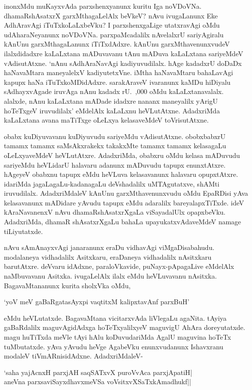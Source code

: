 inonxMdu muKayxvAda parxshenxyanunx kuritu Iga noVDoVNa. dhamaRshAsatxrX garxMthagaLelAlx beVkeV? nAvu ivugaLanunx Eke AdhAravAgi iTuTxkoLaLxbeVku? I parxshenxgaLige utatxravAgi oMdu udAharaNeyanunx noVDoVNa. parxpaMcadalilx nAvelalxrU sariyAgiralu kAnUnu garxMthagaLanunx iTiTxdAdxre. kAnUnu garxMthavenunxvudeV ilalxdidadxre kaLaLxtana mADuvavanu tAnu mADuva kaLaLxtana sariyeMdeV vAdisutAtxne. `nAnu sAdhAraNavAgi kadiyuvudilalx. hAge kadadxrU doDaDx haNavaMtara maneyalelxV kadiyutetxVne. iMtha haNavaMtaru bahaLavAgi kapupx haNa iTuTxkoMDidAdxre. sarakAraveV ivaranunx kaMDu hiDiyalu sAdhayxvAgade iruvAga nAnu kadadx rU.\ {,000} oMdu kaLaLxtanavalalx. alalxde, nAnu kaLaLxtana mADade idadxre nananx maneyalilx yArigU hoTeTxgeV iruvudilalx' eMdelAlx kaLaLxnu heVLutAtxne. AdadxriMda kaLaLxtana avana maTiTxge oLeLxya kelasaveMdeV toVrisutAtxne.

obabx kuDiyuvavanu kuDiyuvudu sariyeMdu vAdisutAtxne. obobxbabxrU tamamx tamamx saMsAkxrakekx takakxMte tamamx tamamx kelasagaLu oLeLxyaveMdeV heVLutAtxre. AdadxriMda, obabxru oMdu kelasa mADuvudu sariyeMdu heVLidarU halavaru adanunx mADuvudu tapupx enunxtAtxre. hAgeyeV obabxnu tapupx eMdu heVLuva kelasavanunx halavaru opupxtAtxre. idariMda jagaLagaLu-kadanagaLu deVshadalilx uMTAgutatxve, shAMti iruvudilalx. AdadxriMdaleV kAnUnu garxMthavenunxvudu oMdu EpaRDisi yAva kelasavanunx mADidare yAvudu tapupx eMdu adaralilx bareyalapxTiTxde. ideV kAraNavanenxV nAvu dhamaRshAsatxrXgaLa viSayadalUlx opapxbeVku. AdadxriMda, dhamaR shAsatxrXgaLu bahaLa upayukatxvAdaveMdeV namage tiLiyutatxde.

nAvu sAmAnayxvAgi janaranunx eraDu vidhavAgi viMgaDisabahudu. modalaneya vidhadalilx Asitxkaru, eraDaneya vidhadalilx nAsitxkaru barutAtxre. deVvaru idAdxne, paraloVkavide, puNayx-pApagaLive eMdelAlx naMbuvavanu Asitxka. ivugaLelAlx ilalx eMdu heVLuvavanu nAsitxka. BagavaMtananunx kurita sholxVka oMdu, 

\begin{shloka}
`yoV meV gaBaRgatasAyxpi vaqtitxM kalipxtavAnf parxBuH'
\end{shloka}

\noindent eMdu heVLutatxde. BagavaMtana vicitarxvAda liVlegaLu agaNita. tAyiya gaBaRdalilx maguvAgidAdxga hoTeTxyalilxyeV maguvigU AhAra doreyutatxde. magu huTiTxda meVle tAyi hAlu koDuvudariMda AgalU maguvina hoTeTx tuMbutatxde. yAva yAvudu heVge AgabeVku enunxvudanunx Ishavxranu modaleV tiVmARnisidAdxne. AdadxriMdaleV-

\begin{shloka}
`saha yajAcnxH parxjAH saqSATxvX puroVvAca parxjApatiH|\\
aneVna parxsaviSayxdhavxmeVSa voV\s sitxvXSaTxkAmadhukf||
\end{shloka}

